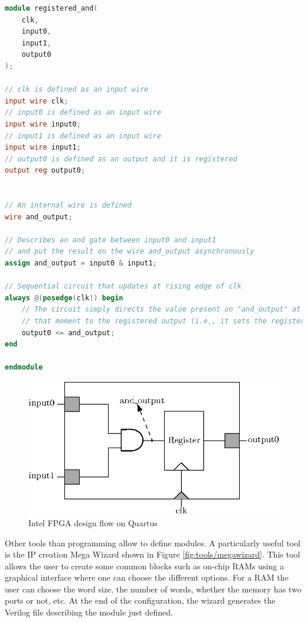 {\small
\begin{lstlisting}[language=Verilog, caption=Verilog Registered AND gate example]
module registered_and(
    clk,
    input0,
    input1,
    output0
);

// clk is defined as an input wire 
input wire clk;   
// input0 is defined as an input wire  
input wire input0;  
// input1 is defined as an input wire
input wire input1; 
// output0 is defined as an output and it is registered
output reg output0; 


// An internal wire is defined
wire and_output;    

// Describes an and gate between input0 and input1
// and put the result on the wire and_output asynchronously
assign and_output = input0 & input1; 

// Sequential circuit that updates at rising edge of clk
always @(posedge(clk)) begin
    // The circuit simply directs the value present on "and_output" at 
    // that moment to the registered output (i.e., it sets the register).
    output0 <= and_output;                      
end

endmodule
\end{lstlisting}}

\begin{figure}[H]
    \centering
    \includegraphics[scale=1.0]{Chapter2-FPGA_Flow/res/register_and}
    \caption{Intel FPGA design flow on Quartus}
    \label{fig:verilog/register_and}
\end{figure}

Other tools than programming allow to define modules. A particularly useful tool is the IP creation 
Mega Wizard shown in Figure \ref{fig:tools/megawizard}. This tool allows the user to create some common 
blocks such as on-chip RAMs using a graphical interface where one can choose the different options. 
For a RAM the user can choose the word size, the number of words, whether the memory has 
two ports or not, etc. At the end of the configuration, the wizard generates the Verilog file 
describing the module just defined.

